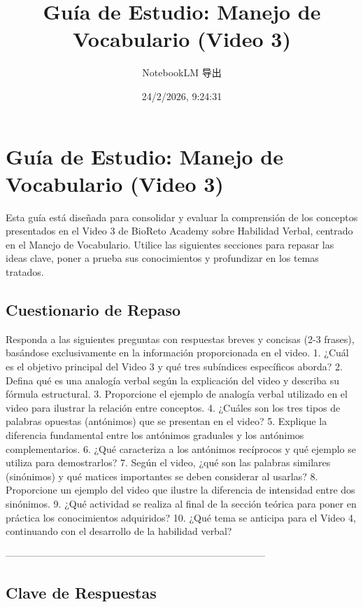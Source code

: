 \documentclass[a4paper,12pt]{ctexart}
\title{Guía de Estudio: Manejo de Vocabulario (Video 3)}
\author{NotebookLM 导出}
\date{24/2/2026, 9:24:31}
\begin{document}
\maketitle

\section{Guía de Estudio: Manejo de Vocabulario (Video 3)}

Esta guía está diseñada para consolidar y evaluar la comprensión de los conceptos presentados en el Video 3 de BioReto Academy sobre Habilidad Verbal, centrado en el Manejo de Vocabulario. Utilice las siguientes secciones para repasar las ideas clave, poner a prueba sus conocimientos y profundizar en los temas tratados.
\subsection{Cuestionario de Repaso}

Responda a las siguientes preguntas con respuestas breves y concisas (2-3 frases), basándose exclusivamente en la información proporcionada en el video.
1. ¿Cuál es el objetivo principal del Video 3 y qué tres subíndices específicos aborda?
2. Defina qué es una analogía verbal según la explicación del video y describa su fórmula estructural.
3. Proporcione el ejemplo de analogía verbal utilizado en el video para ilustrar la relación entre conceptos.
4. ¿Cuáles son los tres tipos de palabras opuestas (antónimos) que se presentan en el video?
5. Explique la diferencia fundamental entre los antónimos graduales y los antónimos complementarios.
6. ¿Qué caracteriza a los antónimos recíprocos y qué ejemplo se utiliza para demostrarlos?
7. Según el video, ¿qué son las palabras similares (sinónimos) y qué matices importantes se deben considerar al usarlas?
8. Proporcione un ejemplo del video que ilustre la diferencia de intensidad entre dos sinónimos.
9. ¿Qué actividad se realiza al final de la sección teórica para poner en práctica los conocimientos adquiridos?
10. ¿Qué tema se anticipa para el Video 4, continuando con el desarrollo de la habilidad verbal?

--------------------------------------------------------------------------------

\subsection{Clave de Respuestas}
\end{document}
